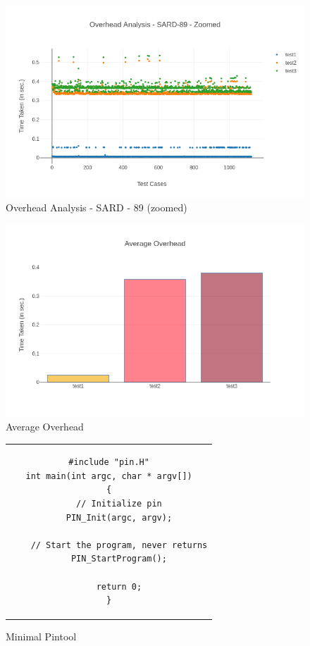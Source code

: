 \begin{figure}
\begin{centering}
\includegraphics[width=140mm]{images/sard89_overhead_zoomed.png}
\caption{Overhead Analysis - SARD - 89 (zoomed)\label{fig:fig413}}
\par\end{centering}
\end{figure}

\begin{figure}
\begin{centering}
\includegraphics[width=140mm]{images/average_overhead.png}
\caption{Average Overhead\label{fig:fig414}}
\par\end{centering}
\end{figure}

\begin{figure}
\begin{centering}
\begin{tabular}{ c }
\begin{lstlisting}
#include "pin.H"
int main(int argc, char * argv[])
{
    // Initialize pin
    PIN_Init(argc, argv);

    // Start the program, never returns
    PIN_StartProgram();

    return 0;
}
\end{lstlisting}
\end{tabular}
\caption{Minimal Pintool\label{fig:fig415}}
\par\end{centering}
\end{figure}